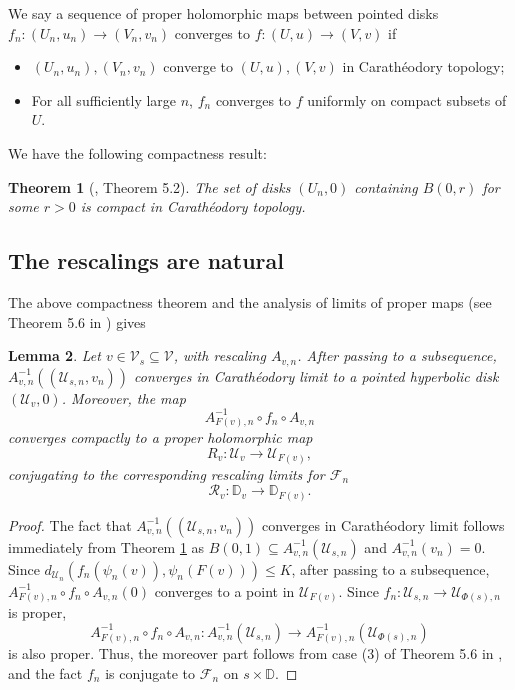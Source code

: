 \documentclass[11pt, reqno]{amsart}
\numberwithin{equation}{section}
\theoremstyle{plain}
\newtheorem{theorem}{Theorem}[section]
\theoremstyle{theorem}
\newtheorem{lem}[theorem]{Lemma}
\theoremstyle{definition}
\newcommand{\C}{\mathbb{C}}
\newcommand{\D}{\mathbb{D}}
\newcommand{\bp}{\mathcal{F}}
\newcommand{\rl}{\mathcal{R}}
\newcommand{\U}{\mathcal{U}}
\numberwithin{figure}{section}
\begin{document}
We say a sequence of proper holomorphic maps between pointed disks $f_n: (U_n, u_n) \longrightarrow (V_n, v_n)$ converges to $f:(U, u) \longrightarrow (V, v)$ if 
\begin{itemize}
\item $(U_n, u_n), (V_n,v_n)$ converge to $(U, u), (V, v)$ in Carath\'eodory topology;
\item For all sufficiently large $n$, $f_n$ converges to $f$ uniformly on compact subsets of $U$.
\end{itemize}

We have the following compactness result:
\begin{theorem}[\cite{McM94}, Theorem 5.2]\label{thm:cmpc}
The set of disks $(U_n, 0)$ containing $B(0,r)$ for some $r>0$ is compact in Carath\'eodory topology.
\end{theorem}

\subsection*{The rescalings are natural}
The above compactness theorem and the analysis of limits of proper maps (see Theorem 5.6 in \cite{McM94}) gives
\begin{lem}\label{lem:clr}
Let $v\in \mathcal{V}_s \subseteq \mathcal{V}$, with rescaling $A_{v,n}$. 
After passing to a subsequence, $A_{v,n}^{-1}((\U_{s,n}, v_n))$ converges in Carath\'eodory limit to a pointed hyperbolic disk $(\U_v, 0)$.
Moreover, the map 
$$
A_{F(v),n}^{-1} \circ f_n \circ A_{v,n}
$$ 
converges compactly to a proper holomorphic map
$$
R_v:\U_v \longrightarrow \U_{F(v)},
$$ 
conjugating to the corresponding rescaling limits for $\bp_n$
$$
\rl_v: \D_v \longrightarrow \D_{F(v)}.
$$
\end{lem}
\begin{proof}
The fact that $A_{v,n}^{-1}((\U_{s,n}, v_n))$ converges in Carath\'eodory limit follows immediately from Theorem \ref{thm:cmpc} as $B(0,1) \subseteq A_{v,n}^{-1}(\U_{s,n})$ and $A_{v, n}^{-1}(v_n) = 0$.
Since $d_{\U_n}(f_n(\psi_n(v)), \psi_n(F(v))) \leq K$, after passing to a subsequence, $A_{F(v),n}^{-1} \circ f_n \circ A_{v,n}(0)$ converges to a point in $\U_{F(v)}$.
Since $f_n: \U_{s,n} \longrightarrow \U_{\Phi(s),n}$ is proper,
$$
A_{F(v),n}^{-1} \circ f_n \circ A_{v,n} : A_{v,n}^{-1}(\U_{s,n}) \longrightarrow A_{F(v),n}^{-1}(\U_{\Phi(s),n})
$$ 
is also proper. 
Thus, the moreover part follows from case (3) of Theorem 5.6 in \cite{McM94}, and the fact $f_n$ is conjugate to $\bp_n$ on $s\times \D$.
\end{proof}
\end{document}

